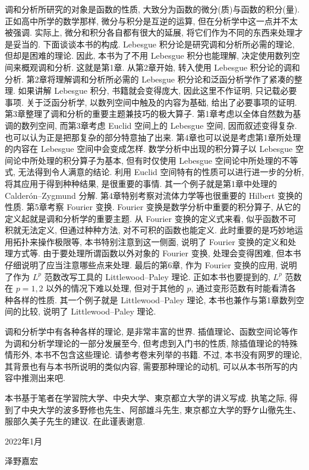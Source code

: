 调和分析所研究的对象是函数的性质, 大致分为函数的微分(质)与函数的积分(量). 正如高中所学的数学那样, 微分与积分是互逆的运算, 但在分析学中这一点并不太被强调. 实际上, 微分和积分各自都有很大的延展, 将它们作为不同的东西来处理才是妥当的. 下面谈谈本书的构成. Lebesgue 积分论是研究调和分析所必需的理论, 但却是困难的理论. 因此, 本书为了不用 Lebesgue 积分也能理解, 决定使用数列空间来概观调和分析. 这就是第1章. 从第2章开始, 转入使用 Lebesgue 积分论的调和分析. 第2章将理解调和分析所必需的 Lebesgue 积分论和泛函分析学作了紧凑的整理. 如果讲解 Lebesgue 积分, 书籍就会变得庞大, 因此这里不作证明, 只记载必要事项. 关于泛函分析学, 以数列空间中触及的内容为基础, 给出了必要事项的证明. 第3章整理了调和分析的重要主题兼技巧的极大算子. 第1章考虑以全体自然数为基调的数列空间, 而第3章考虑 Euclid 空间上的 Lebesgue 空间, 因而叙述变得复杂. 也可以认为正是把那复杂的部分特意抽了出来. 第4章也可以说是考虑第1章所处理的内容在 Lebesgue 空间中会变成怎样. 数学分析中出现的积分算子以 Lebesgue 空间论中所处理的积分算子为基本, 但有时仅使用 Lebesgue 空间论中所处理的不等式, 无法得到令人满意的结论. 利用 Euclid 空间特有的性质可以进行进一步的分析, 将其应用于得到种种结果, 是很重要的事情. 其一个例子就是第1章中处理的 Calderón--Zygmund 分解. 第4章特别考察对流体力学等也很重要的 Hilbert 变换的性质. 第5章考察 Fourier 变换. Fourier 变换是数学分析中重要的积分算子, 从它的定义起就是调和分析学的重要主题. 从 Fourier 变换的定义式来看, 似乎函数不可积就无法定义, 但通过种种方法, 对不可积的函数也能定义. 此时重要的是巧妙地运用拓扑来操作极限等, 本书特别注意到这一侧面, 说明了 Fourier 变换的定义和处理方式等. 由于要处理所谓函数以外对象的 Fourier 变换, 处理会变得困难, 但本书仔细说明了应当注意哪些点来处理. 最后的第6章, 作为 Fourier 变换的应用, 说明了作为 $L^{p}$ 范数改写工具的 Littlewood--Paley 理论. 正如本书也要提到的, $L^{p}$ 范数在 $p = 1, 2$ 以外的情况下难以处理, 但对于其他的 $p$, 通过变形范数有时能看清各种各样的性质. 其一个例子就是 Littlewood--Paley 理论, 本书也兼作与第1章数列空间的比较, 说明了 Littlewood--Paley 理论.

调和分析学中有各种各样的理论, 是非常丰富的世界. 插值理论、函数空间论等作为调和分析学理论的一部分发展至今, 但考虑到入门书的性质, 除插值理论的特殊情形外, 本书不包含这些理论. 请参考卷末列举的书籍. 不过, 本书没有网罗的理论, 其背景也有与本书所说明的类似内容, 需要那种理论的动机, 可以从本书所写的内容中推测出来吧.

本书基于笔者在学習院大学、中央大学、東京都立大学的讲义写成. 执笔之际, 得到了中央大学的波多野修也先生、阿部雄斗先生, 東京都立大学的野ケ山徹先生、服部久美子先生的建议. 在此谨表谢意.

2022年1月

泽野嘉宏
